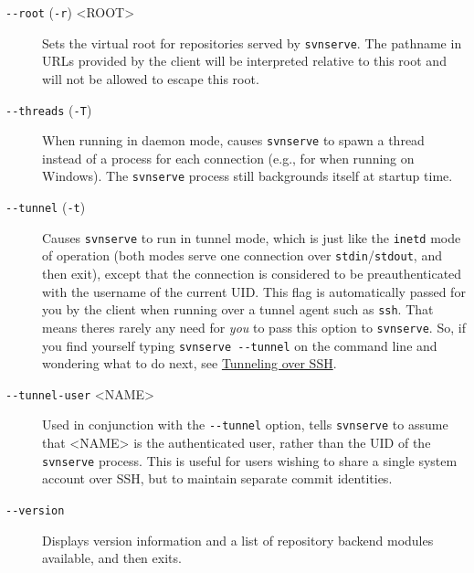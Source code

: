 \begin{description}
\item[\protect{}\label{svn.ref.svnserve.sw.root}{}\texttt{-\/-root}
(\texttt{-r}) \textless ROOT\textgreater{}]
Sets the virtual root for repositories served by \texttt{svnserve}. The
pathname in URLs provided by the client will be interpreted relative to
this root and will not be allowed to escape this root.
\item[\protect{}\label{svn.ref.svnserve.sw.threads}{}\texttt{-\/-threads}
(\texttt{-T})]
When running in daemon mode, causes \texttt{svnserve} to spawn a thread
instead of a process for each connection (e.g., for when running on
Windows). The \texttt{svnserve} process still backgrounds itself at
startup time.
\item[\protect{}\label{svn.ref.svnserve.sw.tunnel}{}\texttt{-\/-tunnel}
(\texttt{-t})]
Causes \texttt{svnserve} to run in tunnel mode, which is just like the
\texttt{inetd} mode of operation (both modes serve one connection over
\texttt{stdin}/\texttt{stdout}, and then exit), except that the
connection is considered to be preauthenticated with the username of the
current UID. This flag is automatically passed for you by the client
when running over a tunnel agent such as \texttt{ssh}. That means
there\textquotesingle s rarely any need for \emph{you} to pass this
option to \texttt{svnserve}. So, if you find yourself typing
\texttt{svnserve\ -\/-tunnel} on the command line and wondering what to
do next, see \hyperref[svn.serverconfig.svnserve.sshauth]{Tunneling over
SSH}.
\item[\protect{}\label{svn.ref.svnserve.sw.tunnel_user}{}\texttt{-\/-tunnel-user}
\textless NAME\textgreater{}]
Used in conjunction with the \texttt{-\/-tunnel} option, tells
\texttt{svnserve} to assume that \textless NAME\textgreater{} is the
authenticated user, rather than the UID of the \texttt{svnserve}
process. This is useful for users wishing to share a single system
account over SSH, but to maintain separate commit identities.
\item[\protect{}\label{svn.ref.svnserve.sw.version}{}\texttt{-\/-version}]
Displays version information and a list of repository backend modules
available, and then exits.
\end{description}

